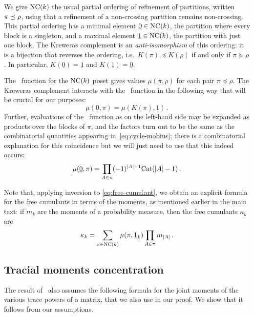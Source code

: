 We give $\mathrm{NC}(k)$ the usual partial ordering of refinement of partitions, written $\pi \preceq \rho$, using that a refinement of a non-crossing partition remains non-crossing.
This partial ordering has a minimal element $\underline{0} \in \mathrm{NC}(k)$, the partition where every block is a singleton, and a maximal element $\underline{1} \in \mathrm{NC}(k)$, the partition with just one block.
The Kreweras complement is an \emph{anti-isomorphism} of this ordering: it is a bijection that reverses the ordering, i.e.\ $K(\pi) \preceq K(\rho)$ if and only if $\pi \succeq \rho$.
In particular, $K(\underline{0}) = \underline{1}$ and $K(\underline{1}) = \underline{0}$.

The \Mobius\ function for the $\mathrm{NC}(k)$ poset gives values $\mu(\pi, \rho)$ for each pair $\pi \preceq \rho$.
The Kreweras complement interacts with the \Mobius\ function in the following way that will be crucial for our purposes:
\begin{equation}\label{eq:kreweras-mobius}
\mu(\underline{0}, \pi) = \mu(K(\pi), \underline{1})\,. 
\end{equation}
Further, evaluations of the \Mobius\ function as on the left-hand side may be expanded as products over the blocks of $\pi$, and the factors turn out to be the same as the combinatorial quantities appearing in~\cref{eq:cycle-mobius}; there is a combinatorial explanation for this coincidence but we will just need to use that this indeed occurs:
\[ \mu(\underline{0}, \pi) = \prod_{A \in \pi} (-1)^{|A| - 1} \mathrm{Cat}(|A| - 1)\,. \]

Note that, applying \Mobius inversion to \cref{eq:free-cumulant}, we obtain an explicit formula for the free cumulants in terms of the moments, as mentioned earlier in the main text: if $m_k$ are the moments of a probability measure, then the free cumulants $\kappa_k$ are
\begin{equation} \label{eq:free-cumulant-explicit}
\kappa_k = \sum_{\pi \in \mathrm{NC}(k)} \mu(\pi, \underline{1}_k) \prod_{A \in \pi} m_{|A|}\,. 
\end{equation}




\subsection{Tracial moments concentration}

The result of~\cite{cebron2024traffic} also assumes the following formula for the joint moments of the various trace powers of a matrix, that we also use in our proof.
We show that it follows from our assumptions.

